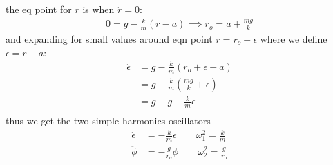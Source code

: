 \documentclass[../hw.tex]{subfiles}
\begin{document}
the eq point for $r$ is when $\ddot r = 0$:
\begin{align*}
    0 = g - \frac{k}{m}(r - a) \implies r_o = a + \frac{mg}{k}
\end{align*}
and expanding for small values around eqn point $r = r_o + \epsilon$ where we define $\epsilon = r - a$:
\begin{align*}
    \ddot \epsilon &= g - \frac{k}{m}(r_o + \epsilon - a) \\
    &= g - \frac{k}{m}(\frac{mg}{k} + \epsilon) \\
    &= g - g - \frac{k}{m}\epsilon \\
\end{align*}
thus we get the two simple harmonics oscillators
\begin{align*}
    \ddot \epsilon &= -\frac{k}{m}\epsilon \qquad \omega_1^2 = \frac{k}{m} \\
    \ddot \phi &= -\frac{g}{r_o}\phi \qquad \omega_2^2 = \frac{g}{r_o}
\end{align*}
\end{document}
